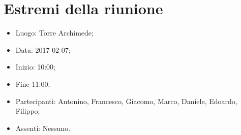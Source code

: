 \documentclass[../verbale-2017-02-07.tex]{subfiles}
\begin{document}
\section{Estremi della riunione}
	\begin{itemize}
		\item Luogo: Torre Archimede;
		\item Data: 2017-02-07;
      \item Inizio: 10:00;
      \item Fine 11:00;
		\item Partecipanti: Antonino, Francesco, Giacomo, Marco, Daniele, Edoardo, Filippo;
      \item Assenti: Nessuno.
	\end{itemize}
\end{document}
